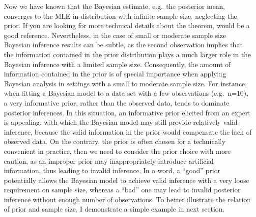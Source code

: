 \documentclass{article}
\numberwithin{equation}{section}
\theoremstyle{plain}
\begin{document}
Now we have known that the Bayesian estimate, e.g.\ the posterior mean, converges to the MLE in distribution with infinite sample size, neglecting the prior. If you are looking for more technical details about the theorem, \cite{Held2014} would be a good reference. Nevertheless, in the case of small or moderate sample size Bayesian inference results can be subtle, as the second observation implies that the information contained in the prior distribution plays a much larger role in the Bayesian inference with a limited sample size. Consequently, the amount of information contained in the prior is of special importance when applying Bayesian analysis in settings with a small to moderate sample size. For instance, when fitting a Bayesian model to a data set with a few observations (e.g.\ n=10), a very informative prior, rather than the observed data, tends to dominate posterior inferences. In this situation, an informative prior elicited from an expert is appealing, with which the Bayesian model may still provide relatively valid inference, because the valid information in the prior would compensate the lack of observed data. On the contrary, the prior is often chosen for a technically convenient in practice, then we need to consider the prior choice with more caution, as an improper prior may inappropriately introduce artificial information, thus leading to invalid inference. In a word, a ``good'' prior potentially allows the Bayesian model to achieve valid inference with a very loose requirement on sample size, whereas a ``bad'' one may lead to invalid posterior inference without enough number of observations. To better illustrate the relation of prior and sample size, I demonstrate a simple example in next section. 
  
\end{document}
